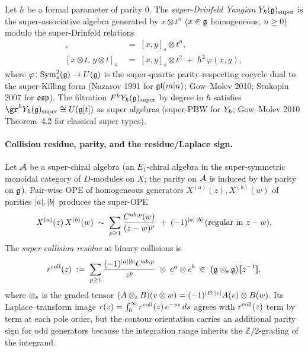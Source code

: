 \begin{definition}
\label{def:super-drinfeld-yangian}
Let $\hbar$ be a formal parameter of parity $\bar 0$. The \emph{super-Drinfeld
Yangian} $Y_{\hbar}(\mathfrak{g})_{\mathrm{super}}$ is the super-associative algebra
generated by $x\otimes t^n$ ($x\in\mathfrak{g}$ homogeneous, $n\ge 0$) modulo the
super-Drinfeld relations
\begin{align*}
 [x\otimes 1, y\otimes t^n]_s
 &\;=\; [x,y]_s\otimes t^n,\\
 [x\otimes t,\, y\otimes t]_s
 &\;=\; [x,y]_s\otimes t^2
 \;+\; \hbar^2\,\varphi(x,y),
\end{align*}
where $\varphi\colon \mathrm{Sym}^2_s(\mathfrak{g})\to U(\mathfrak{g})$ is the super-quartic
parity-respecting cocycle dual to the super-Killing form (Nazarov 1991
for $\mathfrak{gl}(m|n)$; Gow--Molev 2010; Stukopin 2007 for $\mathfrak{osp}$). The
filtration $F^kY_{\hbar}(\mathfrak{g})_{\mathrm{super}}$ by degree in $\hbar$
satisfies $\gr^{\hbar} \Yhbar(\fg)_{\mathrm{super}}\cong U(\fg[t])$ as
super algebras (super-PBW for $Y_{\hbar}$; Gow--Molev 2010 Theorem~4.2 for
classical super types).
\end{definition}

\paragraph{Collision residue, parity, and the residue/Laplace sign.}

Let $\mathcal{A}$ be a super-chiral algebra (an $E_1$-chiral algebra in the
super-symmetric monoidal category of $D$-modules on $X$; the parity on
$\mathcal{A}$ is induced by the parity on $\mathfrak{g}$). Pair-wise OPE of homogeneous
generators $X^{(a)}(z), X^{(b)}(w)$ of parities $|a|,
|b|$ produces the super-OPE
\begin{equation}
 \label{eq:super-ope}
 X^{(a)}(z)\,X^{(b)}(w)
 \;\sim\;
 \sum_{p\ge 1} \frac{C^{ab,p}(w)}{(z-w)^{p}}
 \;+\;(-1)^{|a|\,|b|}\,
 \text{(regular in }z-w).
\end{equation}
The \emph{super collision residue} at binary collisions is
\begin{equation}
 \label{eq:super-coll-residue}
 r^{\mathrm{coll}}(z) \;:=\;
 \sum_{p\ge 1} \frac{(-1)^{|a||b|}C^{ab,p}}{z^p}
 \;\otimes\; e^a\otimes e^b
 \;\in\; \bigl(\mathfrak{g}\mathbin{\otimes_{\mathrm{s}}}\mathfrak{g}\bigr)[\![z^{-1}]\!],
\end{equation}
where $\mathbin{\otimes_{\mathrm{s}}}$ is the graded tensor
$(A\mathbin{\otimes_{\mathrm{s}}} B)(v\otimes w) = (-1)^{|B||v|} A(v)\otimes B(w)$.
Its Laplace--transform image $r(z) = \int_0^\infty r^{\mathrm{coll}}(z)\,e^{-sz}\,ds$
agrees with $r^{\mathrm{coll}}(z)$ term by term at each pole order, but the
contour orientation carries an additional parity sign for odd generators
because the integration range inherits the $\mathbb{Z}/2$-grading of the
integrand.

